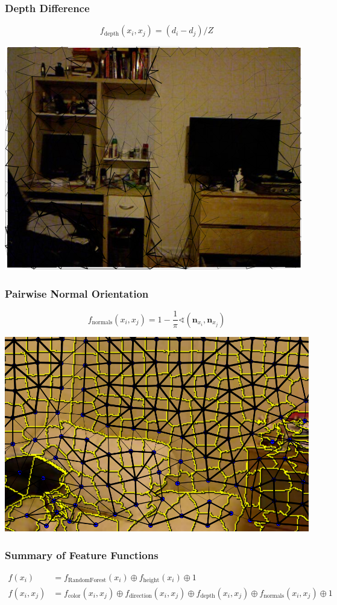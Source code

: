 \documentclass[final,ignorenonframetext,compress]{beamer}
\begin{document}
    \begin{frame}
        \frametitle{Depth Difference}
        \[
            f_\text{depth}(x_i, x_j) = (d_i - d_j) / Z
         \]
        \begin{center}
            \includegraphics[width=.6\linewidth]{images/00062_pipline_feature_pairwise_2}
        \end{center}
    \end{frame}
    

    \begin{frame}
        \frametitle{Pairwise Normal Orientation}
        \[
            f_\text{normals}(x_i, x_j) = 1 - \frac{1}{\pi}\sphericalangle(\mathbf{n}_{x_i}, \mathbf{n}_{x_j})
         \]
        \begin{center}
            \includegraphics[width=.6\linewidth]{images/normal_feature}
        \end{center}
    \end{frame}


    \begin{frame}
        \frametitle{Summary of Feature Functions}
        \begin{align*}
            f(x_i) &= f_\text{RandomForest}(x_i) \oplus f_\text{height}(x_i) \oplus 1\\
            f(x_i, x_j) &= f_\text{color}(x_i, x_j) \oplus f_\text{direction}(x_i, x_j) \oplus f_\text{depth}(x_i, x_j) \oplus f_\text{normals}(x_i, x_j) \oplus 1
        \end{align*}
        
    \end{frame}
\end{document}

